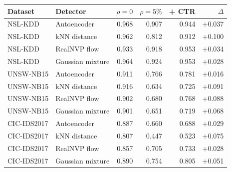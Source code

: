 \begin{tabular}{llrrrr}
\toprule
Dataset & Detector & $\rho{=}0$ & $\rho{=}5\%$ & + CTR & $\Delta$ \\
\midrule
NSL-KDD & Autoencoder & 0.968 & 0.907 & 0.944 & +0.037 \\
NSL-KDD & kNN distance & 0.962 & 0.812 & 0.912 & +0.100 \\
NSL-KDD & RealNVP flow & 0.933 & 0.918 & 0.953 & +0.034 \\
NSL-KDD & Gaussian mixture & 0.964 & 0.924 & 0.953 & +0.028 \\
\midrule
UNSW-NB15 & Autoencoder & 0.911 & 0.766 & 0.781 & +0.016 \\
UNSW-NB15 & kNN distance & 0.916 & 0.634 & 0.725 & +0.091 \\
UNSW-NB15 & RealNVP flow & 0.902 & 0.680 & 0.768 & +0.088 \\
UNSW-NB15 & Gaussian mixture & 0.901 & 0.651 & 0.719 & +0.068 \\
\midrule
CIC-IDS2017 & Autoencoder & 0.887 & 0.660 & 0.688 & +0.029 \\
CIC-IDS2017 & kNN distance & 0.807 & 0.447 & 0.523 & +0.075 \\
CIC-IDS2017 & RealNVP flow & 0.857 & 0.705 & 0.733 & +0.028 \\
CIC-IDS2017 & Gaussian mixture & 0.890 & 0.754 & 0.805 & +0.051 \\
\bottomrule
\end{tabular}